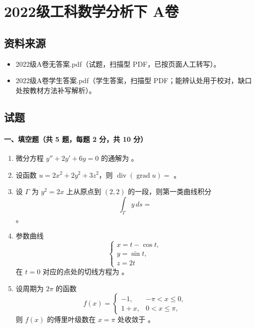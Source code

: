 \section{2022级工科数学分析下 A卷}

\subsection{资料来源}
\begin{itemize}
  \item 2022级A卷无答案.pdf（试题，扫描型 PDF，已按页面人工转写）。
  \item 2022级A卷学生答案.pdf（学生答案，扫描型 PDF；能辨认处用于校对，缺口处按教材方法补写解析）。
\end{itemize}

\subsection{试题}

\paragraph*{一、填空题（共 5 题，每题 2 分，共 10 分）}
\begin{enumerate}
  \item 微分方程 $y''+2y'+6y=0$ 的通解为 \underline{\hspace{4cm}}。
  \item 设函数 $u=2x^2+2y^2+3z^2$，则 $\operatorname{div}(\operatorname{grad}u)=$ \underline{\hspace{3cm}}。
  \item 设 $\Gamma$ 为 $y^2=2x$ 上从原点到 $(2,2)$ 的一段，则第一类曲线积分
  \[
    \int_\Gamma y\,ds=
  \]
  \underline{\hspace{3cm}}。
  \item 参数曲线
  \[
    \begin{cases}
      x=t-\cos t,\\
      y=\sin t,\\
      z=2t
    \end{cases}
  \]
  在 $t=0$ 对应的点处的切线方程为 \underline{\hspace{5cm}}。
  \item 设周期为 $2\pi$ 的函数
  \[
    f(x)=
    \begin{cases}
      -1, & -\pi<x\le 0,\\
      1+x, & 0<x\le \pi,
    \end{cases}
  \]
  则 $f(x)$ 的傅里叶级数在 $x=\pi$ 处收敛于 \underline{\hspace{3cm}}。
\end{enumerate}

